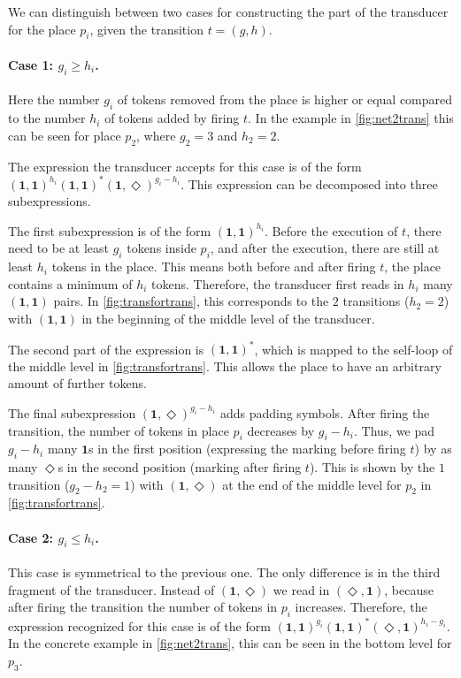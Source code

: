 We can distinguish between two cases for constructing the part of the transducer for the place $p_{i}$, given the transition $t = (g,h)$.

\paragraph{Case 1: $g_{i} \ge h_{i}$.}

Here the number $g_{i}$ of tokens removed from the place is higher or equal compared to the number $h_{i}$ of tokens added by firing $t$. In the example in \autoref{fig:net2trans} this can be seen for place $p_{2}$, where $g_{2} = 3 $ and $h_{2} = 2$.

The expression the transducer accepts for this case is of the form $(\bm{1},\bm{1})^{h_{i}}(\bm{1},\bm{1})^{\bm{*}}(\bm{1},\Diamond)^{g_{i}-h_{i}}$. This expression can be decomposed into three subexpressions. 

The first subexpression is of the form $(\bm{1},\bm{1})^{h_{i}}$. Before the execution of $t$, there need to be at least $g_{i}$ tokens inside $p_{i}$, and after the execution, there are still at least $h_{i}$ tokens in the place. This means both before and after firing $t$, the place contains a minimum of $h_{i}$ tokens. Therefore, the transducer first reads in $h_{i}$ many $(\bm{1},\bm{1})$ pairs. In \autoref{fig:transfortrans}, this corresponds to the $2$ transitions ($h_{2} = 2$) with $(\bm{1},\bm{1})$ in the beginning of the middle level of the transducer.

The second part of the expression is $(\bm{1},\bm{1})^{\bm{*}}$, which is mapped to the self-loop of the middle level in \autoref{fig:transfortrans}. This allows the place to have an arbitrary amount of further tokens. 

The final subexpression $(\bm{1},\Diamond)^{g_{i}-h_{i}}$ adds padding symbols. After firing the transition, the number of tokens in place $p_{i}$ decreases by $g_{i}-h_{i}$. Thus, we pad $g_{i}-h_{i}$ many $\bm{1}$s in the first position (expressing the marking before firing $t$) by as many $\Diamond$s in the second position (marking after firing $t$). This is shown by the $1$ transition ($g_{2}-h_{2} = 1$) with $(\bm{1},\Diamond)$ at the end of the middle level for $p_{2}$ in \autoref{fig:transfortrans}.

\paragraph{Case 2: $g_{i} \le h_{i}$.}
This case is symmetrical to the previous one. The only difference is in the third fragment of the transducer. Instead of $(\bm{1},\Diamond)$ we read in $(\Diamond,\bm{1})$, because after firing the transition the number of tokens in $p_{i}$ increases. Therefore, the expression recognized for this case is of the form $(\bm{1},\bm{1})^{g_{i}}(\bm{1},\bm{1})^{\bm{*}}(\Diamond,\bm{1})^{h_{i}-g_{i}}$. In the concrete example in \autoref{fig:net2trans}, this can be seen in the bottom level for $p_{3}$.



